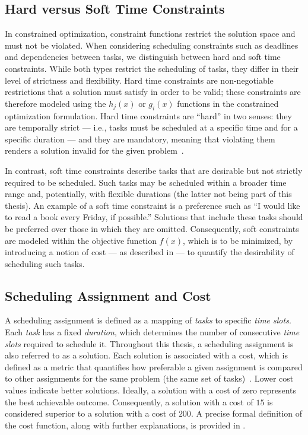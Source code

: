 \subsection{Hard versus Soft Time Constraints}
\label{subsec:preliminaries-related-work:time-theory:time-representation:hard-vs-soft}
In constrained optimization, constraint functions restrict the solution space and must not be violated. When considering scheduling constraints such as deadlines and dependencies between tasks, we distinguish between hard and soft time constraints. While both types restrict the scheduling of tasks, they differ in their level of strictness and flexibility. Hard time constraints are non-negotiable restrictions that a solution must satisfy in order to be valid; these constraints are therefore modeled using the $h_j(x)$ or $g_i(x)$ functions in the constrained optimization formulation. Hard time constraints are ``hard'' in two senses: they are temporally strict --- i.e., tasks must be scheduled at a specific time and for a specific duration --- and they are mandatory, meaning that violating them renders a solution invalid for the given problem~\cite{bib:2017-diveev}.

In contrast, soft time constraints describe tasks that are desirable but not strictly required to be scheduled. Such tasks may be scheduled within a broader time range and, potentially, with flexible durations (the latter not being part of this thesis). An example of a soft time constraint is a preference such as ``I would like to read a book every Friday, if possible.'' Solutions that include these tasks should be preferred over those in which they are omitted. Consequently, soft constraints are modeled within the objective function $f(x)$, which is to be minimized, by introducing a notion of cost --- as described in  --- to quantify the desirability of scheduling such tasks.

\subsection{Scheduling Assignment and Cost}
\label{subsec:preliminaries-related-work:time-theory:assignment-cost}
A scheduling assignment is defined as a mapping of \emph{tasks} to specific \emph{time slots}. Each \emph{task} has a fixed \emph{duration}, which determines the number of consecutive \emph{time slots} required to schedule it. Throughout this thesis, a scheduling assignment is also referred to as a solution. Each solution is associated with a cost, which is defined as a metric that quantifies how preferable a given assignment is compared to other assignments for the same problem (the same set of tasks)~\cite{bib:2022-lester}. Lower cost values indicate better solutions. Ideally, a solution with a cost of zero represents the best achievable outcome. Consequently, a solution with a cost of $15$ is considered superior to a solution with a cost of $200$. A precise formal definition of the cost function, along with further explanations, is provided in .

